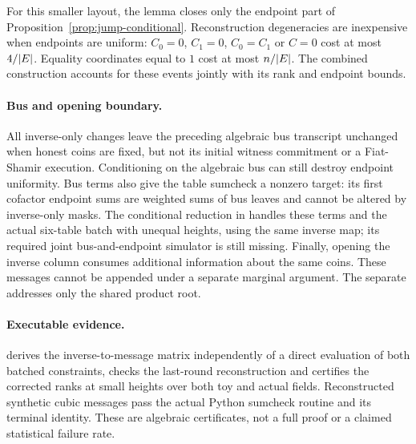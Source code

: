 \documentclass[11pt]{article}
\begin{document}
For this smaller layout, the lemma closes only the endpoint part of Proposition~\ref{prop:jump-conditional}. Reconstruction degeneracies are inexpensive when endpoints are uniform: $C_0=0$, $C_1=0$, $C_0=C_1$ or $C=0$ cost at most $4/|E|$. Equality coordinates equal to $1$ cost at most $n/|E|$. The combined construction accounts for these events jointly with its rank and endpoint bounds.

\paragraph{Bus and opening boundary.} All inverse-only changes leave the preceding algebraic bus transcript unchanged when honest coins are fixed, but not its initial witness commitment or a Fiat-Shamir execution. Conditioning on the algebraic bus can still destroy endpoint uniformity. Bus terms also give the table sumcheck a nonzero target: its first cofactor endpoint sums are weighted sums of bus leaves and cannot be altered by inverse-only masks. The conditional reduction in  handles these terms and the actual six-table batch with unequal heights, using the same inverse map; its required joint bus-and-endpoint simulator is still missing. Finally, opening the inverse column consumes additional information about the same coins. These messages cannot be appended under a separate marginal argument. The separate  addresses only the shared product root.

\paragraph{Executable evidence.}  derives the inverse-to-message matrix independently of a direct evaluation of both batched constraints, checks the last-round reconstruction and certifies the corrected ranks at small heights over both toy and actual fields. Reconstructed synthetic cubic messages pass the actual Python sumcheck routine and its terminal identity. These are algebraic certificates, not a full proof or a claimed statistical failure rate.
\end{document}
